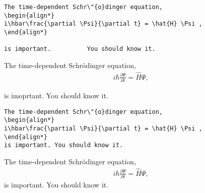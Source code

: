 \documentclass[12pt,a4paper]{article}
\begin{document}
\begin{verbatim}
The time-dependent Schr\"{o}dinger equation,
\begin{align*}
i\hbar\frac{\partial \Psi}{\partial t} = \hat{H} \Psi ,
\end{align*}

is important.          You should know it.
\end{verbatim}
The time-dependent Schr\"{o}dinger equation,
\begin{align*}
i\hbar\frac{\partial \Psi}{\partial t} = \hat{H} \Psi ,
\end{align*}

is imoprtant.          You should know it.
\vspace{2cm}
\begin{verbatim}
The time-dependent Schr\"{o}dinger equation,
\begin{align*}
i\hbar\frac{\partial \Psi}{\partial t} = \hat{H} \Psi ,
\end{align*}
is important. You should know it.
\end{verbatim}
The time-dependent Schr\"{o}dinger equation,
\begin{align*}
i\hbar\frac{\partial \Psi}{\partial t} = \hat{H} \Psi ,
\end{align*}
is important. You should know it.
\end{document}
